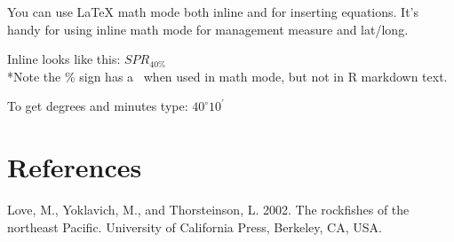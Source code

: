 \documentclass[12pt,]{article}
\begin{document}
You can use LaTeX math mode both inline and for inserting equations.
It's handy for using inline math mode for management measure and
lat/long.

Inline looks like this: \(SPR_{40\%}\)\\
*Note the \% sign has a ~when used in math mode, but not in R markdown
text.

To get degrees and minutes type: \(40^\circ 10^\prime\)

\section*{References}\label{references}

\hypertarget{refs}{}
\hypertarget{ref-Love2002}{}
Love, M., Yoklavich, M., and Thorsteinson, L. 2002. The rockfishes of
the northeast Pacific. University of California Press, Berkeley, CA,
USA.
\end{document}
